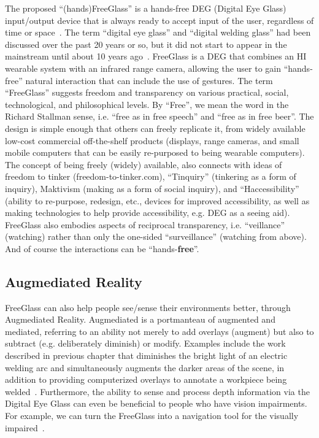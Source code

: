The proposed 
``(hands)FreeGlass'' is a hands-free
DEG (Digital Eye Glass) input/output device that is always ready
to accept input of the user, regardless of time or
space~\cite{mann1998wearcam, mann1997wearable, mannaaai361, mistry2009sixthsense}.
The term ``digital eye glass'' and ``digital welding glass''  had been discussed over the past 20 years or so,
but it did not start to appear in the mainstream until about 10 years ago~\cite{Deg}.
FreeGlass is a DEG that combines an HI wearable system with an infrared range camera, allowing the user to
gain ``hands-free'' natural interaction that can include the use of gestures.
The term ``FreeGlass'' suggests freedom and transparency on various practical, social, technological, and philosophical levels. By ``Free'', we mean the word in the Richard Stallman sense,
i.e. ``free as in free speech'' and ``free as in free beer''.
The design is simple enough that others can freely replicate it, from widely available low-cost
commercial off-the-shelf products (displays, range cameras, and small mobile computers that can be easily re-purposed to being wearable computers).
The concept of being freely (widely) available, also connects with ideas of freedom
to tinker (freedom-to-tinker.com), ``Tinquiry'' (tinkering as a form of inquiry),
Maktivism (making as a form of social inquiry), and ``Haccessibility''
(ability to re-purpose, redesign, etc., devices for improved
accessibility, as well as making technologies to help provide accessibility,
e.g. DEG as a seeing aid).
FreeGlass also embodies aspects of reciprocal transparency,
i.e. ``veillance'' (watching) rather than only the one-sided
``surveillance'' (watching from above).
And of course the interactions can be ``hands-{\bf free}''.

\subsection{Augmediated Reality}
FreeGlass can also help people see/sense their environments better,
through Augmediated Reality. Augmediated is a portmanteau of augmented and mediated, referring to an ability not merely to add overlays (augment) but also to subtract (e.g. deliberately diminish) or modify. Examples include the work described in previous chapter that diminishes the bright light of an electric welding arc and simultaneously augments the darker areas of the scene, in addition to providing computerized overlays to annotate a
workpiece being welded~\cite{lo2012high,mann2012hdrchitecture,mann2012realtime}. Furthermore,
the ability to sense and process depth information via the Digital Eye Glass can even be beneficial to people who have vision impairments. For example, we can turn the FreeGlass into a navigation tool for the visually impaired~\cite{mann2011blind}. 

